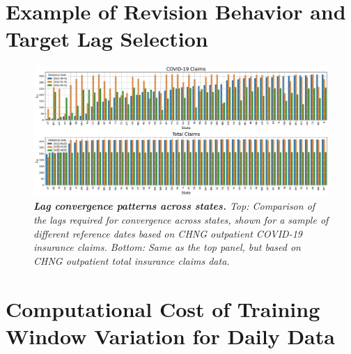 \appendix

\section{Example of Revision Behavior and Target Lag Selection}
\renewcommand{\thefigure}{S\arabic{figure}} %
\setcounter{figure}{0} %
\begin{figure}[h!]
    \centering
    \includegraphics[width=\textwidth]{figs/Lit_examples.pdf}
    \caption{\emph{\textbf{Lag convergence patterns across states.} Top: Comparison of the lags required for convergence across states, shown for a sample of different reference dates based on CHNG outpatient COVID-19 insurance claims. Bottom: Same as the top panel, but based on CHNG outpatient total insurance claims data.}}

\end{figure}


\section{Computational Cost of Training Window Variation for Daily Data}

